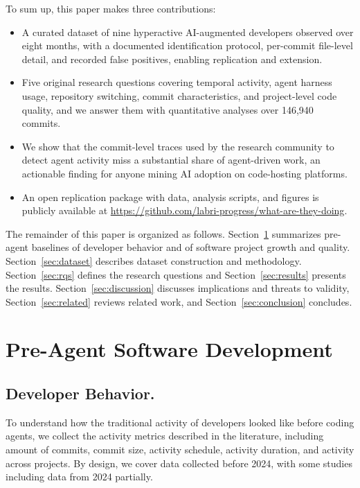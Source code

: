 \documentclass[smallextended]{svjour3}
\begin{document}
To sum up, this paper makes three contributions:
\begin{itemize}
  \item A curated dataset of nine hyperactive AI-augmented developers observed over eight months, with a documented identification protocol, per-commit file-level detail, and recorded false positives, enabling replication and extension.
  \item Five original research questions covering temporal activity, agent harness usage, repository switching, commit characteristics, and project-level code quality, and we answer them with quantitative analyses over 146,940 commits.
  \item We show that the commit-level traces used by the research community to detect agent activity miss a substantial share of agent-driven work, an actionable finding for anyone mining AI adoption on code-hosting platforms.
  \item An open replication package with data, analysis scripts, and figures is publicly available at \url{https://github.com/labri-progress/what-are-they-doing}.
\end{itemize}

The remainder of this paper is organized as follows.
Section~\ref{sec:baseline} summarizes pre-agent baselines of developer behavior and of software project growth and quality.
Section~\ref{sec:dataset} describes dataset construction and methodology.
Section~\ref{sec:rqs} defines the research questions and Section~\ref{sec:results} presents the results.
Section~\ref{sec:discussion} discusses implications and threats to validity, Section~\ref{sec:related} reviews related work, and Section~\ref{sec:conclusion} concludes.

\section{Pre-Agent Software Development} \label{sec:baseline}

\subsection{Developer Behavior.}

To understand how the traditional activity of developers looked like before coding agents, we collect the activity metrics described in the literature, including amount of commits, commit size, activity schedule, activity duration, and activity across projects. By design, we cover data collected before 2024, with some studies including data from 2024 partially.
\end{document}
